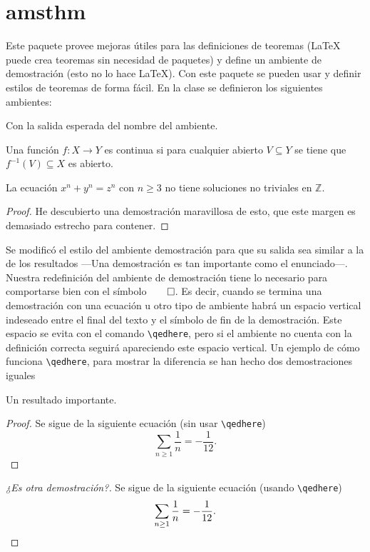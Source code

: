 \section{amsthm}
Este paquete provee mejoras útiles para las definiciones de teoremas
(\LaTeX{} puede crea teoremas sin necesidad de paquetes) y
define un ambiente de demostración (esto no lo hace \LaTeX{}). Con este
paquete se pueden usar y definir estilos de teoremas de forma fácil. En la clase se definieron los siguientes ambientes:
\begin{center}
\end{center}
Con la salida esperada del nombre del ambiente.

\begin{definicion}
  Una función \(f\colon X\to Y\) es continua si para cualquier abierto
  \(V\subseteq Y\) se tiene que \(f^{-1}(V)\subseteq X\) es abierto.
\end{definicion}

\begin{teorema}[Fermat]%
\label{teo:fermat}
  La ecuación \(x^n + y^n = z^n\) con \(n\geq 3\) no tiene soluciones no triviales en \(\mathbb{Z}\).
\end{teorema}
\begin{proof}
  He descubierto una demostración maravillosa de esto, que este margen es
  demasiado estrecho para contener.
\end{proof}

Se modificó el estilo del ambiente demostración para que su salida sea similar a la de los resultados —Una demostración es tan importante como el
enunciado—. Nuestra redefinición del ambiente de demostración tiene lo necesario para comportarse bien con el símbolo\(\qed \). Es decir, cuando se termina una demostración con una ecuación u otro tipo de ambiente habrá
un espacio vertical indeseado entre el final del texto y el símbolo de fin de la demostración. Este espacio se evita con el comando \verb|\qedhere|, pero si el ambiente no cuenta con la definición correcta seguirá
apareciendo este espacio vertical. Un ejemplo de cómo funciona \verb|\qedhere|, para mostrar la diferencia se han hecho dos demostraciones iguales

\begin{teorema}
  Un resultado importante.
\end{teorema}
\begin{proof}
  Se sigue de la siguiente ecuación (sin usar \verb|\qedhere|)
  \[
    \sum_{n\geq 1}\frac{1}{n}=-\frac{1}{12}.
  \]
\end{proof}
\begin{proof}[¿Es otra demostración?]
  Se sigue de la siguiente ecuación (usando \verb|\qedhere|)
  \[
    \sum_{n\geq 1}\frac{1}{n}=-\frac{1}{12}. \qedhere
  \]
\end{proof}

